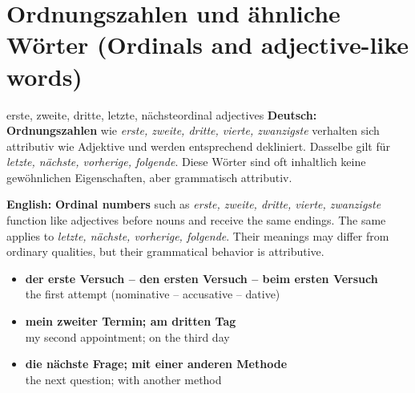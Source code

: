 \documentclass[a4paper,11pt]{article}
\newcommand{\GermanText}[1]{\textbf{Deutsch: }#1\par}
\newcommand{\EnglishText}[1]{{\small\color{SoftGray}\textbf{English: }#1\par}}
\newcommand{\ExampleItem}[2]{\item \textbf{#1}\\{\small\color{SoftGray}#2}}
\begin{document}
\section{Ordnungszahlen und ähnliche Wörter \textnormal{(Ordinals and adjective-like words)}}
\begin{grammarentry}{erste, zweite, dritte, letzte, nächste}{ordinal adjectives}
\GermanText{\textbf{Ordnungszahlen} wie \emph{erste, zweite, dritte, vierte, zwanzigste} verhalten sich attributiv wie Adjektive und werden entsprechend dekliniert. Dasselbe gilt für \emph{letzte, nächste, vorherige, folgende}. Diese Wörter sind oft inhaltlich keine gewöhnlichen Eigenschaften, aber grammatisch attributiv.}
\EnglishText{\textbf{Ordinal numbers} such as \emph{erste, zweite, dritte, vierte, zwanzigste} function like adjectives before nouns and receive the same endings. The same applies to \emph{letzte, nächste, vorherige, folgende}. Their meanings may differ from ordinary qualities, but their grammatical behavior is attributive.}
\end{grammarentry}
\begin{exbox}\begin{itemize}
\ExampleItem{der erste Versuch -- den ersten Versuch -- beim ersten Versuch}{the first attempt (nominative -- accusative -- dative)}
\ExampleItem{mein zweiter Termin; am dritten Tag}{my second appointment; on the third day}
\ExampleItem{die nächste Frage; mit einer anderen Methode}{the next question; with another method}
\end{itemize}\end{exbox}
\end{document}
